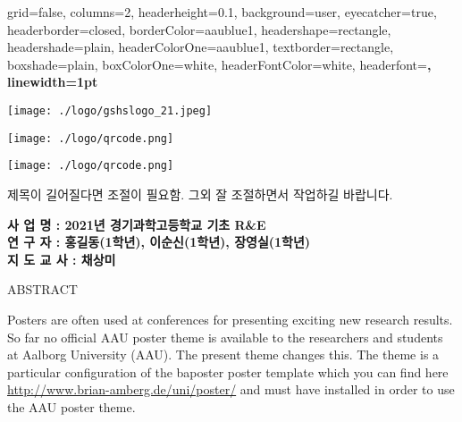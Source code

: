 \documentclass[a0paper,portrait]{baposter}
\newcommand{\alert}[1]{{\color{aaublue1}#1}}
\begin{document}
\begin{poster}{
  grid=false,
  columns=2,
  headerheight=0.1\textheight,
  background=user,
  eyecatcher=true,
  headerborder=closed,
  borderColor=aaublue1,
  headershape=rectangle,
  headershade=plain,
  headerColorOne=aaublue1,
  textborder=rectangle,
  boxshade=plain,
  boxColorOne=white,
  headerFontColor=white,
  headerfont=\Large\sf\bf,
  linewidth=1pt
}
{
  \texttt{[image: ./logo/gshslogo\_21.jpeg]}

  \texttt{[image: ./logo/qrcode.png]}

 
  \texttt{[image: ./logo/qrcode.png]}

}
{\color{black}\LARGE
 제목이 길어질다면 조절이 필요함. 그외 잘 조절하면서 작업하길 바랍니다. 
}
{\color{black}\small
  \vspace{0.2em} 
  \begin{flushright}
  \normalsize{
  \textbf{
  사   업   명 : 2021년 경기과학고등학교 기초 R\&E\\[0.2em]
  연   구   자 : 홍길동(1학년), 이순신(1학년), 장영실(1학년)\\[0.2em]
  지 도 교 사 : 채상미 }}
  \end{flushright}
}


\begin{posterbox}[name=intro,span=2, column=0,row=0, ]{ABSTRACT}

  Posters are often used at conferences for presenting exciting new research results.
  So far no official AAU poster theme is available to the researchers and students at Aalborg University (AAU).
 The present theme changes this.
  The theme is a particular configuration of the \alert{baposter} poster template \cite{baposter} which you can find here \url{http://www.brian-amberg.de/uni/poster/} and must have installed in order to use the AAU poster theme.


\end{posterbox}
\end{poster}
\end{document}
